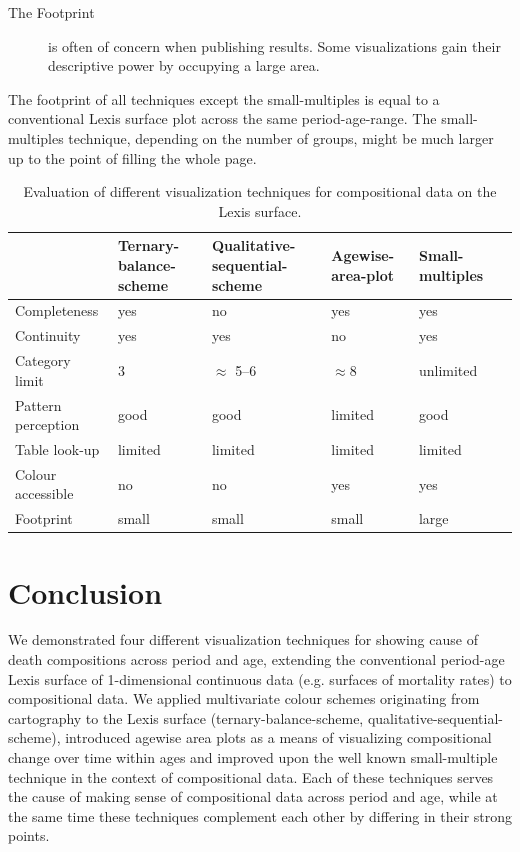 \documentclass[parskip=half]{scrartcl}
\begin{document}
\begin{description}
  \item[The Footprint] is often of concern when publishing results. Some visualizations gain their descriptive power by occupying a large area.
\end{description}

The footprint of all techniques except the small-multiples is equal to a conventional Lexis surface plot across the same period-age-range. The small-multiples technique, depending on the number of groups, might be much larger up to the point of filling the whole page.

\begin{table}[!htb]
\tabformat
\begin{tabular}{p{3.5cm}*5{Q{1.5cm}}}
\toprule
 & Ternary-balance-scheme & Qualitative-sequential-scheme & Agewise-area-plot & Small-multiples \\
\midrule
Completeness & yes & no & yes & yes \\
Continuity & yes & yes & no & yes \\
Category limit & 3 & $\approx$ 5--6 & $\approx 8$ & unlimited \\
Pattern perception & good & good & limited & good \\
Table look-up & limited & limited & limited & limited \\
Colour accessible & no & no & yes & yes \\
Footprint & small & small & small & large \\
\bottomrule
\end{tabular}
\caption{Evaluation of different visualization techniques for compositional data on the Lexis surface.}
\label{tab:eval}
\end{table}

\clearpage

\section{Conclusion} %
\label{sec:con}

We demonstrated four different visualization techniques for showing cause of death compositions across period and age, extending the conventional period-age Lexis surface of 1-dimensional continuous data (e.g. surfaces of mortality rates) to compositional data. We applied multivariate colour schemes originating from cartography to the Lexis surface (ternary-balance-scheme, qualitative-sequential-scheme), introduced agewise area plots as a means of visualizing compositional change over time within ages and improved upon the well known small-multiple technique in the context of compositional data. Each of these techniques serves the cause of making sense of compositional data across period and age, while at the same time these techniques complement each other by differing in their strong points.
\end{document}
